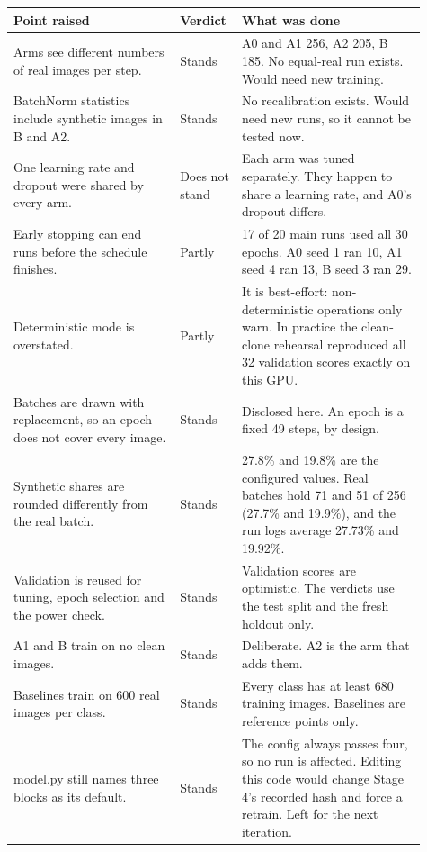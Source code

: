 \begin{tabular}{p{0.38\linewidth}p{0.11\linewidth}p{0.42\linewidth}}
\toprule
Point raised & Verdict & What was done \\
\midrule
Arms see different numbers of real images per step. & Stands & A0 and A1 256, A2 205, B 185. No equal-real run exists. Would need new training. \\
BatchNorm statistics include synthetic images in B and A2. & Stands & No recalibration exists. Would need new runs, so it cannot be tested now. \\
One learning rate and dropout were shared by every arm. & Does not stand & Each arm was tuned separately. They happen to share a learning rate, and A0's dropout differs. \\
Early stopping can end runs before the schedule finishes. & Partly & 17 of 20 main runs used all 30 epochs. A0 seed 1 ran 10, A1 seed 4 ran 13, B seed 3 ran 29. \\
Deterministic mode is overstated. & Partly & It is best-effort: non-deterministic operations only warn. In practice the clean-clone rehearsal reproduced all 32 validation scores exactly on this GPU. \\
Batches are drawn with replacement, so an epoch does not cover every image. & Stands & Disclosed here. An epoch is a fixed 49 steps, by design. \\
Synthetic shares are rounded differently from the real batch. & Stands & 27.8\% and 19.8\% are the configured values. Real batches hold 71 and 51 of 256 (27.7\% and 19.9\%), and the run logs average 27.73\% and 19.92\%. \\
Validation is reused for tuning, epoch selection and the power check. & Stands & Validation scores are optimistic. The verdicts use the test split and the fresh holdout only. \\
A1 and B train on no clean images. & Stands & Deliberate. A2 is the arm that adds them. \\
Baselines train on 600 real images per class. & Stands & Every class has at least 680 training images. Baselines are reference points only. \\
model.py still names three blocks as its default. & Stands & The config always passes four, so no run is affected. Editing this code would change Stage 4's recorded hash and force a retrain. Left for the next iteration. \\
\bottomrule
\end{tabular}

\medskip


